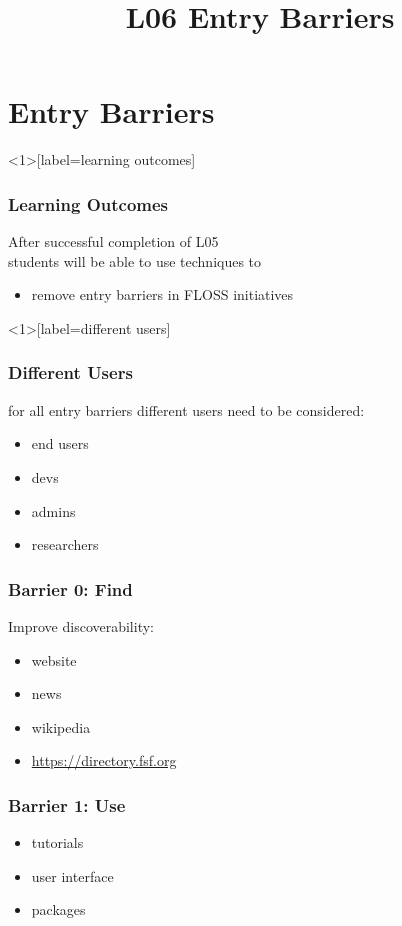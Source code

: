 

\title{L06 Entry Barriers}



\section{Entry Barriers}

\begin{frame}<1>[label=learning outcomes]
	\frametitle{Learning Outcomes}
	After successful completion of L05 \\
	students will be able to
	use techniques to

	\begin{itemize}
	\item remove entry barriers in FLOSS initiatives
	\end{itemize}
\end{frame}

\begin{frame}<1>[label=different users]
	\frametitle{Different Users}

	for all entry barriers different users need to be considered:

	\begin{itemize}[<+-| alert@+>]
	\item end users
	\item devs
	\item admins
	\item researchers
	\end{itemize}
\end{frame}

\begin{frame}
	\frametitle{Barrier 0: Find}

	Improve discoverability:

	\begin{itemize}[<+-| alert@+>]
	\item website
	\item news
	\item wikipedia
	\item \url{https://directory.fsf.org}
	\end{itemize}
\end{frame}

\begin{frame}
	\frametitle{Barrier 1: Use}

	\begin{itemize}[<+-| alert@+>]
	\item tutorials
	\item user interface
	\item packages
	\end{itemize}
\end{frame}

